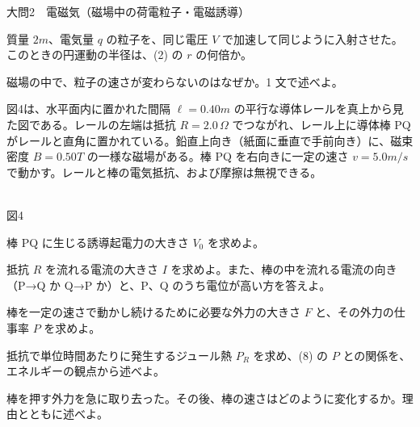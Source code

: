\documentclass[paper=b5, fontsize=8pt, fleqn, twoside]{jlreq}
\begin{document}
\begin{ascolorbox4A}[75点・30分]{大問2　電磁気（磁場中の荷電粒子・電磁誘導）}
\begin{qlist}[series=tb]
\item 質量 $2m$、電気量 $q$ の粒子を、同じ電圧 $V$ で加速して同じように入射させた。このときの円運動の半径は、(2) の $r$ の何倍か。
\item 磁場の中で、粒子の速さが変わらないのはなぜか。1 文で述べよ。
\end{qlist}
\par\noindent
\begin{minipage}[t]{0.50\linewidth}\vspace{0pt}
図4は、水平面内に置かれた間隔 $\ell=0.40\unit{m}$ の平行な導体レールを真上から見た図である。レールの左端は抵抗 $R=2.0\,\Omega$ でつながれ、レール上に導体棒 PQ がレールと直角に置かれている。鉛直上向き（紙面に垂直で手前向き）に、磁束密度 $B=0.50\unit{T}$ の一様な磁場がある。棒 PQ を右向きに一定の速さ $v=5.0\unit{m/s}$ で動かす。レールと棒の電気抵抗、および摩擦は無視できる。
\end{minipage}\hfill
\begin{minipage}[t]{0.47\linewidth}\vspace{0pt}\centering
{}\\[1pt]{\small 図4}
\end{minipage}
\begin{qlist}[resume*=tb]
\item 棒 PQ に生じる誘導起電力の大きさ $V_0$ を求めよ。
\item 抵抗 $R$ を流れる電流の大きさ $I$ を求めよ。また、棒の中を流れる電流の向き（P→Q か Q→P か）と、P、Q のうち電位が高い方を答えよ。
\item 棒を一定の速さで動かし続けるために必要な外力の大きさ $F$ と、その外力の仕事率 $P$ を求めよ。
\item 抵抗で単位時間あたりに発生するジュール熱 $P_R$ を求め、(8) の $P$ との関係を、エネルギーの観点から述べよ。
\item 棒を押す外力を急に取り去った。その後、棒の速さはどのように変化するか。理由とともに述べよ。
\end{qlist}
\end{ascolorbox4A}
\end{document}
